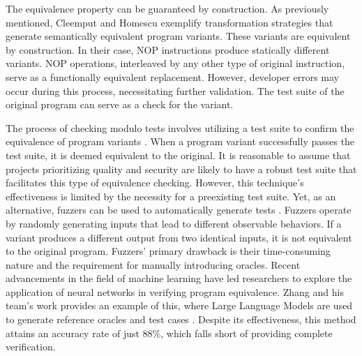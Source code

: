 \begin{checking}
    \label{check_by_construction}
    The equivalence property can be guaranteed by construction.
    As previously mentioned, Cleemput \etal \cite{Cleemput2012} and Homescu \etal \cite{homescu2013profile} exemplify transformation strategies that generate semantically equivalent program variants. 
    These variants are equivalent by construction. 
    In their case, NOP instructions produce statically different variants. 
    NOP operations, interleaved by any other type of original instruction, serve as a functionally equivalent replacement. 
    However, developer errors may occur during this process, necessitating further validation.
    The test suite of the original program can serve as a check for the variant. 
\end{checking}

\begin{checking}
    \label{check_by_tests}

    The process of checking modulo tests involves utilizing a test suite to confirm the equivalence of program variants \cite{10.1007/s10710-013-9195-8, 10.1145/2610384.2610415}. 
    When a program variant successfully passes the test suite, it is deemed equivalent to the original. 
    It is reasonable to assume that projects prioritizing quality and security are likely to have a robust test suite that facilitates this type of equivalence checking.
    However, this technique's effectiveness is limited by the necessity for a preexisting test suite. 
    Yet, as an alternative, fuzzers can be used to automatically generate tests \cite{zalewski2017american}.
    Fuzzers operate by randomly generating inputs that lead to different observable behaviors. 
    If a variant produces a different output from two identical inputs, it is not equivalent to the original program. 
    Fuzzers' primary drawback is their time-consuming nature and the requirement for manually introducing oracles.
    Recent advancements in the field of machine learning have led researchers to explore the application of neural networks in verifying program equivalence.
    Zhang and his team's work provides an example of this, where Large Language Models are used to generate reference oracles and test cases \cite{2023arXiv230514591Z}.
    Despite its effectiveness, this method attains an accuracy rate of just 88\%, which falls short of providing complete verification.

\end{checking}

